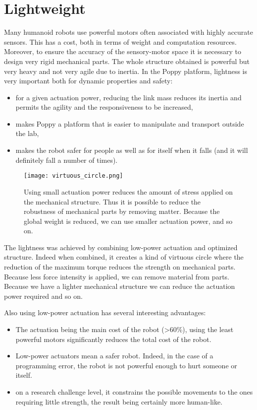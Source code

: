 \section{Lightweight} %

Many humanoid robots use powerful motors often associated with highly accurate sensors. This has a cost, both in terms of weight and computation resources. Moreover, to ensure the accuracy of the sensory-motor space it is necessary to design very rigid mechanical parts. The whole structure obtained is powerful but very heavy and not very agile due to inertia.
In the Poppy platform, lightness is very important both for dynamic properties and safety:
\begin{itemize}
    \item for a given actuation power, reducing the link mass reduces its inertia and permits the agility and the responsiveness to be increased,
    \item makes Poppy a platform that is easier to manipulate and transport outside the lab,
    \item makes the robot safer for people as well as for itself when it falls (and it will definitely fall a number of times).
\end{itemize}

\begin{figure}[!t]
    \centering
        \texttt{[image: virtuous\_circle.png]}
    \caption{Using small actuation power reduces the amount of stress applied on the mechanical structure. Thus it is possible to reduce the robustness of mechanical parts by removing matter. Because the global weight is reduced, we can use smaller actuation power, and so on.}
    \label{fig:virtuous_circle}
\end{figure}

The lightness was achieved by combining low-power actuation and optimized structure. Indeed when combined, it creates a kind of virtuous circle where the reduction of the maximum torque reduces the strength on mechanical parts. Because less force intensity is applied, we can remove material from parts. Because we have a lighter mechanical structure we can reduce the actuation power required and so on.


Also using low-power actuation has several interesting advantages:

\begin{itemize}
    \item The actuation being the main cost of the robot (>60\%), using the least powerful motors significantly reduces the total cost of the robot.
    \item Low-power actuators mean a safer robot. Indeed, in the case of a programming error, the robot is not powerful enough to hurt someone or itself.
    \item on a research challenge level, it constrains the possible movements to the ones requiring little strength, the result being certainly more human-like.
\end{itemize}

